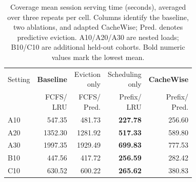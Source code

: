 \begin{table}[t]
  \centering
  \small
  \setlength{\tabcolsep}{3pt}
  \begin{tabular}{lrrrr}
    \toprule
    Setting & \textbf{Baseline} & \shortstack{Eviction\\only} & \shortstack{Scheduling\\only} & \textbf{CacheWise} \\
    & \shortstack{FCFS/\\LRU} & \shortstack{FCFS/\\Pred.} & \shortstack{Prefix/\\LRU} & \shortstack{Prefix/\\Pred.} \\
    \midrule
    A10 & 547.35 & 481.73 & \textbf{227.78} & 256.60 \\
    A20 & 1352.30 & 1281.92 & \textbf{517.33} & 589.80 \\
    A30 & 1997.35 & 1929.49 & \textbf{699.83} & 777.53 \\
    B10 & 447.56 & 417.72 & \textbf{256.59} & 282.42 \\
    C10 & 630.52 & 600.22 & \textbf{265.62} & 380.83 \\
    \bottomrule
  \end{tabular}
  \caption{Coverage mean session serving time (seconds), averaged over three repeats per cell. Columns identify the baseline, two ablations, and adapted CacheWise; Pred. denotes predictive eviction. A10/A20/A30 are nested loads; B10/C10 are additional held-out cohorts. Bold numeric values mark the lowest mean.}
  \label{tab:compact-coverage}
\end{table}
